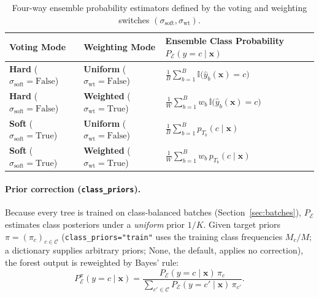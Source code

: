 \documentclass[11pt,a4paper]{article}
\newcommand{\code}[1]{\texttt{#1}}
\newcommand{\Ind}{\mathbb{I}}
\begin{document}
\begin{table}[htbp]
  \centering
  \caption{Four-way ensemble probability estimators defined by the voting and weighting switches $(\sigma_{\text{soft}}, \sigma_{\text{wt}})$.}
  \label{tab:aggregation}
  \small
  \renewcommand{\arraystretch}{1.45}
  \begin{tabular}{@{} ll l @{}}
    \toprule
    \textbf{Voting Mode} & \textbf{Weighting Mode} & \textbf{Ensemble Class Probability $P_{\mathcal{E}}(y = c \mid \mathbf{x})$} \\
    \midrule
    \textbf{Hard} ($\sigma_{\text{soft}} = \text{False}$) & \textbf{Uniform} ($\sigma_{\text{wt}} = \text{False}$) & $\displaystyle \frac{1}{B} \sum_{b=1}^{B} \Ind\!\big(\hat{y}_b(\mathbf{x}) = c\big)$ \\
    \textbf{Hard} ($\sigma_{\text{soft}} = \text{False}$) & \textbf{Weighted} ($\sigma_{\text{wt}} = \text{True}$) & $\displaystyle \frac{1}{W} \sum_{b=1}^{B} w_b\,\Ind\!\big(\hat{y}_b(\mathbf{x}) = c\big)$ \\
    \textbf{Soft} ($\sigma_{\text{soft}} = \text{True}$) & \textbf{Uniform} ($\sigma_{\text{wt}} = \text{False}$) & $\displaystyle \frac{1}{B} \sum_{b=1}^{B} p_{T_b}(c \mid \mathbf{x})$ \\
    \textbf{Soft} ($\sigma_{\text{soft}} = \text{True}$) & \textbf{Weighted} ($\sigma_{\text{wt}} = \text{True}$) & $\displaystyle \frac{1}{W} \sum_{b=1}^{B} w_b\,p_{T_b}(c \mid \mathbf{x})$ \\
    \bottomrule
  \end{tabular}
\end{table}

\paragraph{Prior correction (\code{class\_priors}).}
Because every tree is trained on class-balanced batches (Section~\ref{sec:batches}), $P_{\mathcal{E}}$ estimates class posteriors under a \emph{uniform} prior $1/K$. Given target priors $\pi = (\pi_c)_{c \in \mathcal{C}}$ (\code{class\_priors="train"} uses the training class frequencies $M_c/M$; a dictionary supplies arbitrary priors; None, the default, applies no correction), the forest output is reweighted by Bayes' rule:
\begin{equation}
  P^{\pi}_{\mathcal{E}}(y = c \mid \mathbf{x}) = \frac{P_{\mathcal{E}}(y = c \mid \mathbf{x})\,\pi_c}{\sum_{c' \in \mathcal{C}} P_{\mathcal{E}}(y = c' \mid \mathbf{x})\,\pi_{c'}}.
\end{equation}
\end{document}

